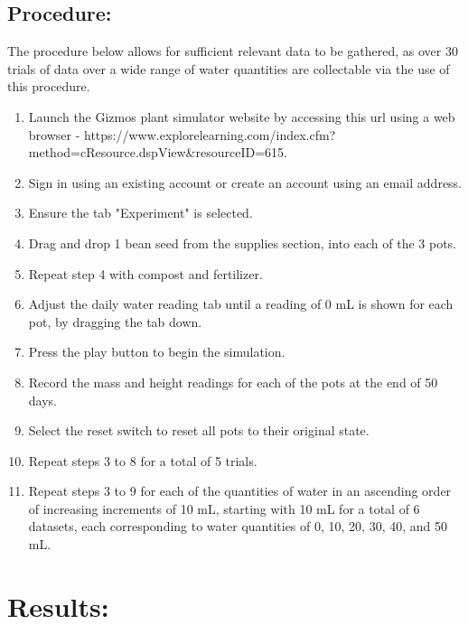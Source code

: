 \documentclass[11pt, a4]{article}
\begin{document}
		\subsection{Procedure:}
		The procedure below allows for sufficient relevant data to be gathered, as over 30 trials of data over a wide range of water quantities are collectable via the use of this procedure.
		\begin{enumerate}
			\item Launch the Gizmos plant simulator website by accessing this url using a web browser - https://www.explorelearning.com/index.cfm?method=cResource.dspView\&resourceID=615.
			
			\item Sign in using an existing account or create an account using an email address.
			
			\item Ensure the tab "Experiment" is selected.
			
			\item Drag and drop 1 bean seed from the supplies section, into each of the 3 pots.
			
			\item Repeat step 4 with compost and fertilizer.
			
			\item Adjust the daily water reading tab until a reading of 0 mL is shown for each pot, by dragging the tab down.
			
			\item Press the play button to begin the simulation.
			
			\item Record the mass and height readings for each of the pots at the end of 50 days.
			
			\item Select the reset switch to reset all pots to their original state.
			
			\item Repeat steps 3 to 8 for a total of 5 trials.
			
			\item Repeat steps 3 to 9 for each of the quantities of water in an ascending order of increasing increments of 10 mL, starting with 10 mL for a total of 6 datasets, each corresponding to water quantities of 0, 10, 20, 30, 40, and 50 mL.
		\end{enumerate}
		\newpage
	\section{Results:}
\end{document}
